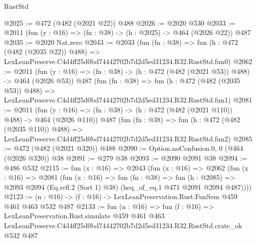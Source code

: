 \begin{lexlean}{RustStd}
\begin{coremodule}
@2025 := @472 (@482 (@2021 @22)) @488
@2026 := @2020 @530
@2033 := @2011 (fun (y : @16) => (fn : @38) -> (h : @2025) -> @464 (@2026 @22)) @487
@2035 := @2020 Nat.zero
@2043 := @2033
    (fun (fn : @38) =>
    fun (h : @472 (@482 (@2035 @22)) @488) =>
    LexLeanPreserve.C4d4ff25d0bd74442702b7d2d5ed31234.R32.RustStd.fun0)
@2062 := @2011
    (fun (y : @16) => (fn : @38) -> (h : @472 (@482 (@2021 @53)) @488) -> @464 (@2026 @53))
    @487
    (fun (fn : @38) =>
    fun (h : @472 (@482 (@2035 @53)) @488) =>
    LexLeanPreserve.C4d4ff25d0bd74442702b7d2d5ed31234.R32.RustStd.fun1)
@2081 := @2011
    (fun (y : @16) => (fn : @38) -> (h : @472 (@482 (@2021 @110)) @488) -> @464 (@2026 @110))
    @487
    (fun (fn : @38) =>
    fun (h : @472 (@482 (@2035 @110)) @488) =>
    LexLeanPreserve.C4d4ff25d0bd74442702b7d2d5ed31234.R32.RustStd.fun2)
@2085 := @472 (@482 (@2021 @320)) @488
@2090 := Option.noConfusion.{0, 0} (@464 (@2026 @320)) @38
@2091 := @279 @38
@2093 := @2090 @2091 @38
@2094 := @486 @532
@2115 := fun (x : @16) =>
  @2043
    (fun (x : @16) =>
    @2062
      (fun (x : @16) =>
      @2081
        (fun (x : @16) =>
        fun (fn : @38) =>
        fun (h : @2085) =>
        @2093 @2094 (Eq.refl.{2} (Sort 1) @38) (heq_of_eq.{1} @471 @2091 @2094 @487))))
@2123 := (n : @16) -> (f : @16) -> LexLeanPreservation.Rust.FunSem @459 @461 @463 @532 @487
@2133 := fun (n : @16) =>
  fun (f : @16) =>
  LexLeanPreservation.Rust.simulate
    @459
    @461
    @463
    LexLeanPreserve.C4d4ff25d0bd74442702b7d2d5ed31234.R32.RustStd.crate_ok
    @532
    @487
\end{coremodule}
\end{lexlean}
